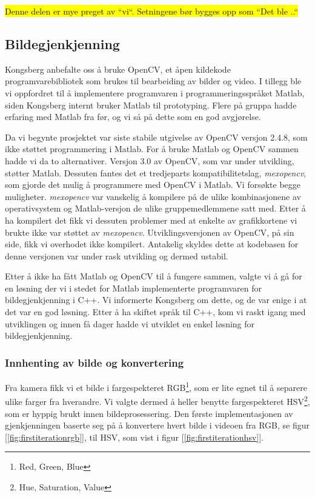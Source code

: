 \colorbox{yellow}{Denne delen er mye preget av ``vi``. Setningene bør bygges opp som ``Det ble ..``}

\subsection{Bildegjenkjenning}

Kongsberg anbefalte oss å bruke OpenCV, et åpen kildekode programvarebibliotek som brukes til bearbeiding av bilder og video. I tillegg ble vi oppfordret til å implementere programvaren i programmeringsspråket Matlab, siden Kongsberg internt bruker Matlab til prototyping. Flere på gruppa hadde erfaring med Matlab fra før, og vi så på dette som en god avgjørelse.

Da vi begynte prosjektet var siste stabile utgivelse av OpenCV versjon 2.4.8, som ikke støttet programmering i Matlab. For å bruke Matlab og OpenCV sammen hadde vi da to alternativer. Versjon 3.0 av OpenCV, som var under utvikling, støtter Matlab. Dessuten fantes det et tredjeparts kompatibilitetslag, \emph{mexopencv}, som gjorde det mulig å programmere med OpenCV i Matlab. Vi forsøkte begge muligheter. \emph{mexopencv} var vanskelig å kompilere på de ulike kombinasjonene av operativsystem og Matlab-versjon de ulike gruppemedlemmene satt med. Etter å ha kompilert det fikk vi dessuten problemer med at enkelte av grafikkortene vi brukte ikke var støttet av \emph{mexopencv}. Utviklingsversjonen av OpenCV, på sin side, fikk vi overhodet ikke kompilert. Antakelig skyldes dette at kodebasen for denne versjonen var under rask utvikling og dermed ustabil.

Etter å ikke ha fått Matlab og OpenCV til å fungere sammen, valgte vi å gå for en løsning der vi i stedet for Matlab implementerte programvaren for bildegjenkjenning i C++. Vi informerte Kongsberg om dette, og de var enige i at det var en god løsning. Etter å ha skiftet språk til C++, kom vi raskt igang med utviklingen og innen få dager hadde vi utviklet en enkel løsning for bildegjenkjenning.

\subsubsection{Innhenting av bilde og konvertering}

Fra kamera fikk vi et bilde i fargespekteret RGB\footnote{Red, Green, Blue}, som er lite egnet til å separere ulike farger fra hverandre. Vi valgte dermed å heller benytte fargespekteret HSV\footnote{Hue, Saturation, Value}, som er hyppig brukt innen bildeprosessering. Den første implementasjonen av gjenkjenningen baserte seg på å konvertere hvert bilde i videoen fra RGB, se figur [\ref{fig:firstiterationrgb}], til HSV, som vist i figur [\ref{fig:firstiterationhsv}].

